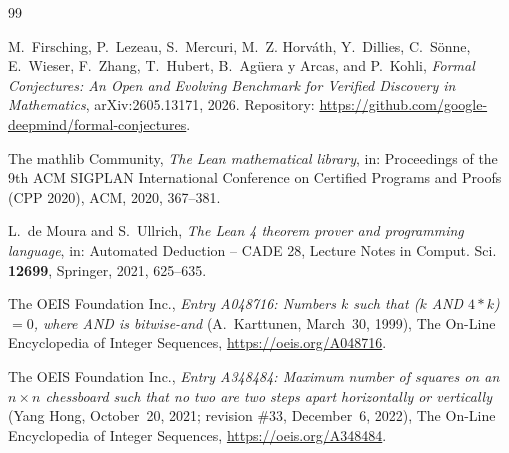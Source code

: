 \documentclass[11pt]{amsart}
\theoremstyle{plain}
\theoremstyle{definition}
\begin{document}
{\small
\begin{thebibliography}{99}

M.~Firsching, P.~Lezeau, S.~Mercuri, M.~Z. Horv\'ath, Y.~Dillies, C.~S\"onne, E.~Wieser, F.~Zhang, T.~Hubert, B.~Ag\"uera y Arcas, and P.~Kohli, \emph{Formal Conjectures: An Open and Evolving Benchmark for Verified Discovery in Mathematics}, arXiv:2605.13171, 2026. Repository: \url{https://github.com/google-deepmind/formal-conjectures}.

The mathlib Community, \emph{The Lean mathematical library}, in: Proceedings of the 9th ACM SIGPLAN International Conference on Certified Programs and Proofs (CPP 2020), ACM, 2020, 367--381.

L.~de Moura and S.~Ullrich, \emph{The Lean 4 theorem prover and programming language}, in: Automated Deduction -- CADE 28, Lecture Notes in Comput. Sci. \textbf{12699}, Springer, 2021, 625--635.

The OEIS Foundation Inc., \emph{Entry A048716: Numbers $k$ such that ($k$ AND $4*k$) $=0$, where AND is bitwise-and} (A.~Karttunen, March~30, 1999), The On-Line Encyclopedia of Integer Sequences, \url{https://oeis.org/A048716}.

The OEIS Foundation Inc., \emph{Entry A348484: Maximum number of squares on an $n\times n$ chessboard such that no two are two steps apart horizontally or vertically} (Yang Hong, October~20, 2021; revision \#33, December~6, 2022), The On-Line Encyclopedia of Integer Sequences, \url{https://oeis.org/A348484}.

\end{thebibliography}
}
\end{document}
